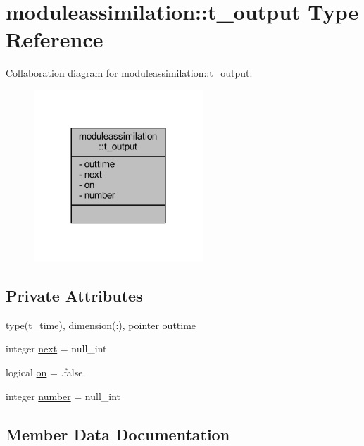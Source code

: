 \hypertarget{structmoduleassimilation_1_1t__output}{}\section{moduleassimilation\+:\+:t\+\_\+output Type Reference}
\label{structmoduleassimilation_1_1t__output}


Collaboration diagram for moduleassimilation\+:\+:t\+\_\+output\+:\nopagebreak
\begin{figure}[H]
\begin{center}
\leavevmode
\includegraphics[width=180pt]{structmoduleassimilation_1_1t__output__coll__graph}
\end{center}
\end{figure}
\subsection*{Private Attributes}
\begin{DoxyCompactItemize}
\item 
type(t\+\_\+time), dimension(\+:), pointer \mbox{\hyperlink{structmoduleassimilation_1_1t__output_a111282edfdd1f45b927ab02c2819e051}{outtime}}
\item 
integer \mbox{\hyperlink{structmoduleassimilation_1_1t__output_ac2cee4d1a8c3f8c845bf0a88e44cc6a2}{next}} = null\+\_\+int
\item 
logical \mbox{\hyperlink{structmoduleassimilation_1_1t__output_ad7c2664645f404ec1ef01c7094dd68cd}{on}} = .false.
\item 
integer \mbox{\hyperlink{structmoduleassimilation_1_1t__output_a1768c370937557c96e04d8ded139be7b}{number}} = null\+\_\+int
\end{DoxyCompactItemize}


\subsection{Member Data Documentation}
\mbox{\label{structmoduleassimilation_1_1t__output_ac2cee4d1a8c3f8c845bf0a88e44cc6a2}} 
